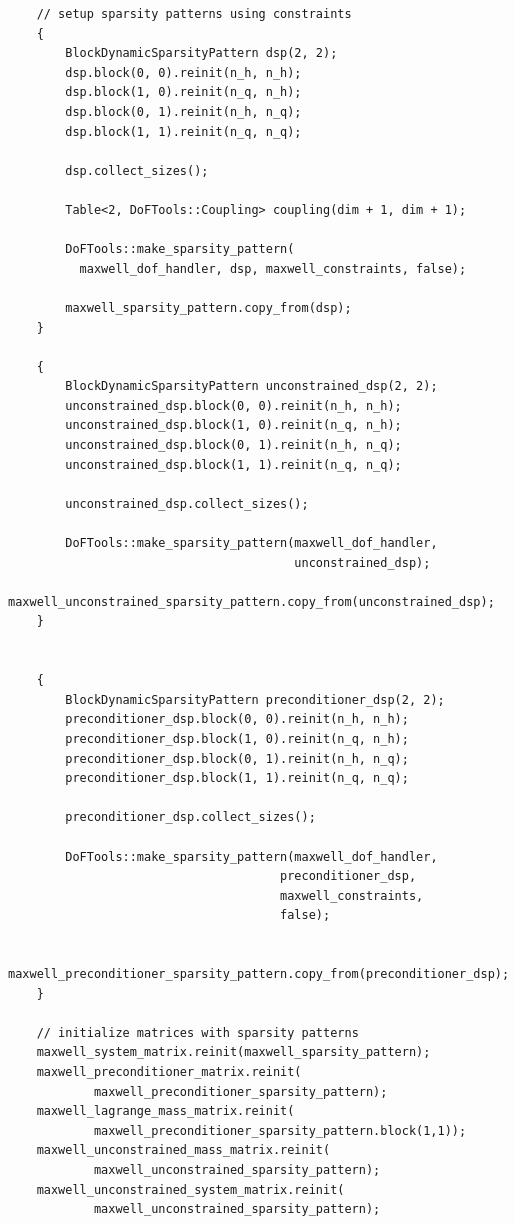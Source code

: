 \documentclass{article}
\begin{document}
\begin{lstlisting}
    // setup sparsity patterns using constraints
    {
        BlockDynamicSparsityPattern dsp(2, 2);
        dsp.block(0, 0).reinit(n_h, n_h);
        dsp.block(1, 0).reinit(n_q, n_h);
        dsp.block(0, 1).reinit(n_h, n_q);
        dsp.block(1, 1).reinit(n_q, n_q);

        dsp.collect_sizes();

        Table<2, DoFTools::Coupling> coupling(dim + 1, dim + 1);

        DoFTools::make_sparsity_pattern(
          maxwell_dof_handler, dsp, maxwell_constraints, false);

        maxwell_sparsity_pattern.copy_from(dsp);
    }

    {
        BlockDynamicSparsityPattern unconstrained_dsp(2, 2);
        unconstrained_dsp.block(0, 0).reinit(n_h, n_h);
        unconstrained_dsp.block(1, 0).reinit(n_q, n_h);
        unconstrained_dsp.block(0, 1).reinit(n_h, n_q);
        unconstrained_dsp.block(1, 1).reinit(n_q, n_q);

        unconstrained_dsp.collect_sizes();

        DoFTools::make_sparsity_pattern(maxwell_dof_handler,
                                        unconstrained_dsp);
        maxwell_unconstrained_sparsity_pattern.copy_from(unconstrained_dsp);
    }


    {
        BlockDynamicSparsityPattern preconditioner_dsp(2, 2);
        preconditioner_dsp.block(0, 0).reinit(n_h, n_h);
        preconditioner_dsp.block(1, 0).reinit(n_q, n_h);
        preconditioner_dsp.block(0, 1).reinit(n_h, n_q);
        preconditioner_dsp.block(1, 1).reinit(n_q, n_q);

        preconditioner_dsp.collect_sizes();

        DoFTools::make_sparsity_pattern(maxwell_dof_handler,
                                      preconditioner_dsp,
                                      maxwell_constraints,
                                      false);

        maxwell_preconditioner_sparsity_pattern.copy_from(preconditioner_dsp);
    }

    // initialize matrices with sparsity patterns
    maxwell_system_matrix.reinit(maxwell_sparsity_pattern);
    maxwell_preconditioner_matrix.reinit(
            maxwell_preconditioner_sparsity_pattern);
    maxwell_lagrange_mass_matrix.reinit(
            maxwell_preconditioner_sparsity_pattern.block(1,1));
    maxwell_unconstrained_mass_matrix.reinit(
            maxwell_unconstrained_sparsity_pattern);
    maxwell_unconstrained_system_matrix.reinit(
            maxwell_unconstrained_sparsity_pattern);


\end{lstlisting}
\end{document}
